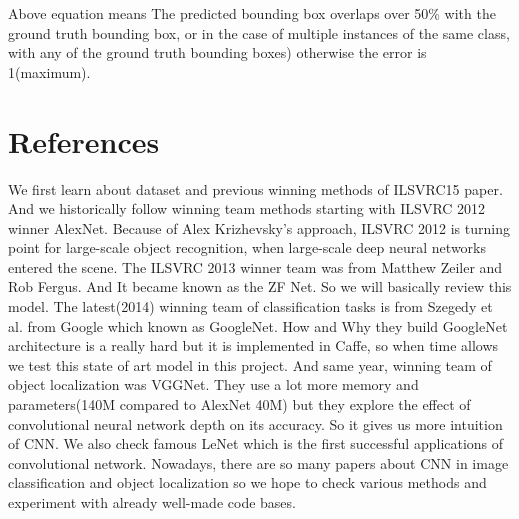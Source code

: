 \documentclass[10pt,twocolumn,letterpaper]{article}
\begin{document}
Above equation means The predicted bounding box overlaps over 50\% with the ground truth bounding box, or in the case of multiple instances of the same class, with any of the ground truth bounding boxes) otherwise the error is 1(maximum).

\section{References}

We first learn about dataset and previous winning methods of ILSVRC15 paper. \cite{ILSVRC15}
And we historically follow winning team methods starting with ILSVRC 2012 winner AlexNet. \cite{AlexNet}
Because of Alex Krizhevsky's approach, ILSVRC 2012 is turning point for large-scale object recognition, when large-scale deep neural networks entered the scene.
The ILSVRC 2013 winner team was from Matthew Zeiler and Rob Fergus.
And It became known as the ZF Net.\cite{ZFNet} So we will basically review this model.
The latest(2014) winning team of classification tasks is from Szegedy et al. from Google which known as GoogleNet. \cite{GoogleNet}
How and Why they build GoogleNet architecture is a really hard but it is implemented in Caffe, so when time allows we test this state of art model in this project.
And same year, winning team of object localization was VGGNet. \cite{VGGNet}
They use a lot more memory and parameters(140M compared to AlexNet 40M) but they explore the effect of convolutional neural network depth on its accuracy.
So it gives us more intuition of CNN.
We also check famous LeNet \cite{LeNet} which is the first successful applications of convolutional network.
Nowadays, there are so many papers about CNN in image classification and object localization so we hope to check various methods and experiment with already well-made code bases.

{\small


}
\end{document}
